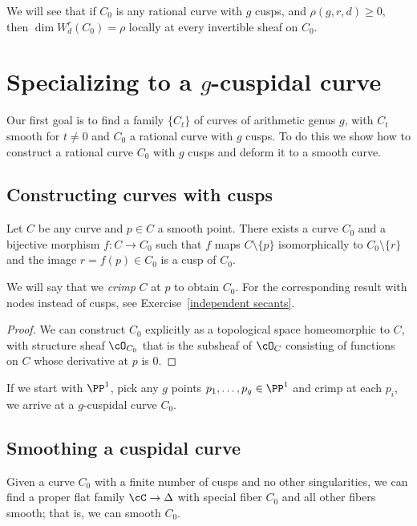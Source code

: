  We will see that if $C_{0}$ is any rational curve
 with $g$ cusps, and $\rho(g,r,d)\geq 0$, then $\dim W^r_d(C_0) = \rho$ locally at every invertible sheaf
 on $C_{0}$.


\section{Specializing to a $g$-cuspidal curve}

Our first goal is to find a family $\{C_t\}$ of curves of arithmetic genus $g$, with $C_t$ smooth for $t \neq 0$ and $C_0$ a rational curve with $g$ cusps. To do this we show how to construct a rational curve $C_0$ with $g$ cusps and deform it to a smooth curve.

\subsection{Constructing curves with cusps}

\begin{proposition}
Let $C$ be any curve and $p \in C$ a smooth point. There exists a curve $C_0$ and a bijective morphism $f : C \to C_0$ such that  $f$ maps $C \setminus \{p\}$ isomorphically to $C_0 \setminus \{r\}$ and the image $r=f(p) \in C_0$ is a cusp of $C_0$.
\end{proposition}

We will say that we \emph{crimp} $C$ at $p$ to obtain $C_{0}$. For the corresponding result with nodes instead of cusps, see Exercise~\ref{independent secants}. 

\begin{proof}
We can construct $C_0$ explicitly as a topological space homeomorphic to $C$, with structure sheaf $\cO_{C_0}$ that is
the subsheaf of $\cO_C$ consisting of functions on $C$ whose derivative at $p$ is 0.
\end{proof}

If we start with $\PP^1$, pick any $g$ points $p_1,\dots, p_g \in \PP^1$ and crimp at each $p_i$, we arrive at a $g$-cuspidal curve $C_0$.


\subsection{Smoothing a cuspidal curve}  Given a curve $C_0$ with a finite number of cusps and no other singularities, we can find a proper flat family $\cC \to \Delta$ with special fiber $C_0$ and all other fibers smooth;
that is, we can smooth $C_0$. 

